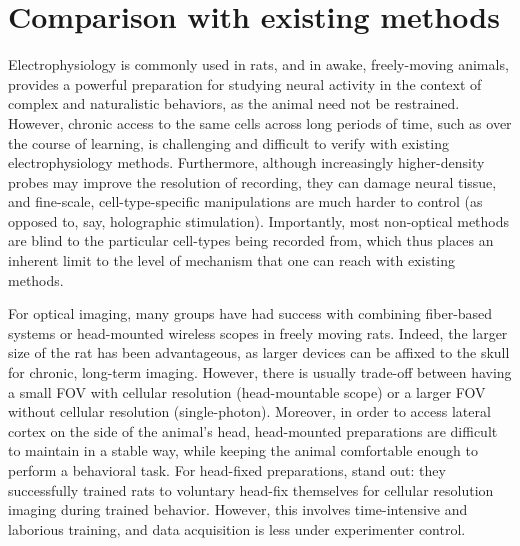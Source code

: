 \section{Comparison with existing methods}
Electrophysiology is commonly used in rats, and in awake, freely-moving animals, provides a powerful preparation for studying neural activity in the context of complex and naturalistic behaviors, as the animal need not be restrained. However, chronic access to the same cells across long periods of time, such as over the course of learning, is challenging and difficult to verify with existing electrophysiology methods. Furthermore, although increasingly higher-density probes may improve the resolution of recording, they can damage neural tissue, and fine-scale, cell-type-specific manipulations are much harder to control (as opposed to, say, holographic stimulation). Importantly, most non-optical methods are blind to the particular cell-types being recorded from, which thus places an inherent limit to the level of mechanism that one can reach with existing methods.

For optical imaging, many groups have had success with combining fiber-based systems or head-mounted wireless scopes in freely moving rats. Indeed, the larger size of the rat has been advantageous, as larger devices can be affixed to the skull for chronic, long-term imaging. However, there is usually trade-off between having a small FOV with cellular resolution (head-mountable scope) or a larger FOV without cellular resolution (single-photon). Moreover, in order to access lateral cortex on the side of the animal’s head, head-mounted preparations are difficult to maintain in a stable way, while keeping the animal comfortable enough to perform a behavioral task. For head-fixed preparations, \citet{Scott2013} stand out:  they successfully trained rats to voluntary head-fix themselves for cellular resolution imaging during trained behavior. However, this involves time-intensive and laborious training, and data acquisition is less under experimenter control. 

